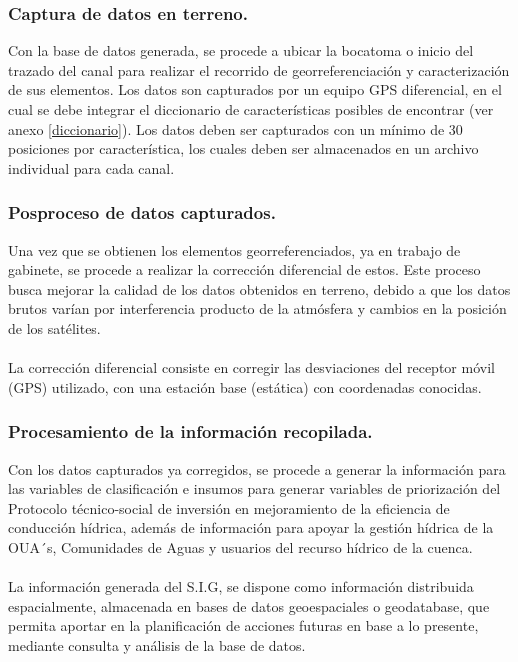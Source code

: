 \documentclass[]{article}
\begin{document}
\subsubsection{Captura de datos en terreno.}

Con la base de datos generada, se procede a ubicar la bocatoma o inicio del trazado del canal para realizar el recorrido de georreferenciación y caracterización de sus elementos. Los datos son capturados por un equipo GPS diferencial, en el cual se debe integrar el diccionario de características posibles de encontrar (ver anexo \ref{diccionario}). Los datos deben ser capturados con un mínimo de 30 posiciones por característica, los cuales deben ser almacenados en un archivo individual para cada canal.

\subsubsection{Posproceso de datos capturados.}

Una vez que se obtienen los elementos georreferenciados, ya en trabajo de gabinete, se procede a realizar la corrección diferencial de estos. Este proceso busca mejorar la calidad de los datos obtenidos en terreno, debido a que los datos brutos varían por interferencia producto de la atmósfera y cambios en la posición de los satélites. \\
\\
La corrección diferencial consiste en corregir las desviaciones del receptor móvil (GPS) utilizado, con una estación base (estática) con coordenadas conocidas.

\subsubsection{Procesamiento de la información recopilada.}

Con los datos capturados ya corregidos, se procede a generar la información para las variables de clasificación e insumos para generar variables de priorización del Protocolo técnico-social de inversión en mejoramiento de la eficiencia de conducción hídrica, además de información para apoyar la gestión hídrica de la OUA´s, Comunidades de Aguas y usuarios del recurso hídrico de la cuenca. \\
\\
La información generada del S.I.G, se dispone como información distribuida espacialmente, almacenada en bases de datos geoespaciales o geodatabase, que permita aportar en la planificación de acciones futuras en base a lo presente, mediante consulta y análisis de la base de datos.
\end{document}
